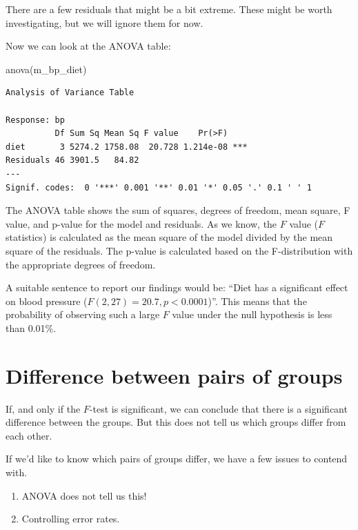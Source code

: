 \documentclass[
  letterpaper,
  8pt,
  a4paper]{book}
\newenvironment{Shaded}{\begin{snugshade}}{\end{snugshade}}
\newcommand{\FunctionTok}[1]{\textcolor[rgb]{0.28,0.35,0.67}{#1}}
\newcommand{\NormalTok}[1]{\textcolor[rgb]{0.00,0.23,0.31}{#1}}
\providecommand{\tightlist}{%
  \setlength{\itemsep}{0pt}\setlength{\parskip}{0pt}}
\begin{document}
There are a few residuals that might be a bit extreme. These might be
worth investigating, but we will ignore them for now.

Now we can look at the ANOVA table:

\begin{Shaded}
\begin{Highlighting}[]
\FunctionTok{anova}\NormalTok{(m\_bp\_diet)}
\end{Highlighting}
\end{Shaded}

\begin{verbatim}
Analysis of Variance Table

Response: bp
          Df Sum Sq Mean Sq F value    Pr(>F)    
diet       3 5274.2 1758.08  20.728 1.214e-08 ***
Residuals 46 3901.5   84.82                      
---
Signif. codes:  0 '***' 0.001 '**' 0.01 '*' 0.05 '.' 0.1 ' ' 1
\end{verbatim}

The ANOVA table shows the sum of squares, degrees of freedom, mean
square, F value, and p-value for the model and residuals. As we know,
the \(F\) value (\(F\) statistics) is calculated as the mean square of
the model divided by the mean square of the residuals. The p-value is
calculated based on the F-distribution with the appropriate degrees of
freedom.

A suitable sentence to report our findings would be: ``Diet has a
significant effect on blood pressure
(\(F(2, 27) = 20.7, p < 0.0001\))''. This means that the probability of
observing such a large \(F\) value under the null hypothesis is less
than 0.01\%.

\section*{Difference between pairs of
groups}\label{difference-between-pairs-of-groups}


If, and only if the \(F\)-test is significant, we can conclude that
there is a significant difference between the groups. But this does not
tell us which groups differ from each other.

If we'd like to know which pairs of groups differ, we have a few issues
to contend with.

\begin{enumerate}
\def\labelenumi{\arabic{enumi}.}
\tightlist
\item
  ANOVA does not tell us this!
\item
  Controlling error rates.
\end{enumerate}
\end{document}
